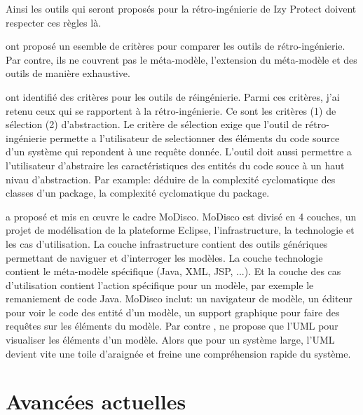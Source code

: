 \documentclass[a4paper]{article}
\begin{document}
Ainsi les outils qui seront proposés pour la rétro-ingénierie de Izy Protect doivent respecter ces règles là.

\citet{Bell98a} ont proposé un esemble de critères pour comparer les outils de rétro-ingénierie.
Par contre, ils ne couvrent pas le méta-modèle, l'extension du méta-modèle et des outils de manière exhaustive.

\citet{Govi18a} ont identifié des critères pour les outils de réingénierie. 
Parmi ces critères, j'ai retenu ceux qui se rapportent à la rétro-ingénierie.
Ce sont les critères (1) de sélection (2) d'abstraction.  
Le critère de sélection exige que l'outil de rétro-ingénierie permette a l'utilisateur de selectionner des éléments  du code source d'un système 
qui repondent à une requête donnée.
L'outil doit aussi permettre a l'utilisateur d'abstraire les caractéristiques des entités du code souce à un haut nivau d'abstraction. 
Par example: déduire de la complexité cyclomatique des classes d'un package, la complexité cyclomatique du package.


\citet{Brun14c} a proposé et mis en œuvre le cadre MoDisco.
MoDisco est divisé en 4 couches, un projet de modélisation de la plateforme Eclipse, l'infrastructure, la technologie et les cas d'utilisation.
La couche infrastructure contient des outils génériques permettant de naviguer et d'interroger les modèles.
La couche technologie contient le méta-modèle spécifique (Java, XML, JSP, ...).
Et la couche des cas d'utilisation contient l'action spécifique pour un modèle, par exemple le remaniement de code Java.
MoDisco inclut: un navigateur de modèle, un éditeur pour voir le code des entité d'un modèle, un support graphique pour faire des requêtes sur les éléments du modèle. 
Par contre \citet{Brun14c}, ne propose que l'UML pour visualiser les éléments d'un modèle.
Alors que pour un système large, l'UML devient vite une toile d'araignée et freine une compréhension rapide du système.

\section{Avancées actuelles}
\end{document}

